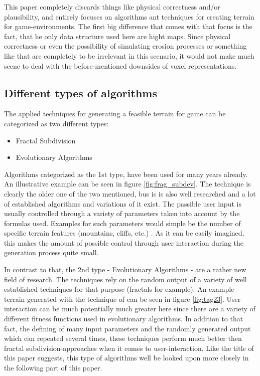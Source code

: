 This paper completely discards things like physical correctness and/or plausibility, and entirely focuses on algorithms ant techniques for creating terrain for game-environments. The first big difference that comes with that focus is the fact, that he only data structure used here are hight maps. Since physical correctness or even the possibility of simulating erosion processes or something like that are completely to be irrelevant in this scenario, it would not make much scene to deal with the before-mentioned downsides of voxel representations.

\subsection{Different types of algorithms}
The applied techniques for generating a feasible terrain for game can be categorized as two different types:
\begin{itemize}
	\item Fractal Subdivision 
	\item Evolutionary Algorithms
\end{itemize}

Algorithms categorized as the 1st type, have been used for many years already. An illustrative example can be seen in figure \ref{fig:frag_subdev}. The technique is clearly the older one of the two mentioned, bus is is also well researched and a lot of established algorithms and variations of it exist. The passible user input is usually controlled through a variety of parameters taken into account by the formulas used. Examples for such parameters would simple be the number of specific terrain features (mountains, cliffs, etc.) \cite{raffe2012survey}. As it can be easily imagined, this makes the amount of possible control through user interaction during the generation process quite small.

In contrast to that, the 2nd type - Evolutionary Algorithms - are a rather new field of research. The techniques rely on the random output of a variety of well established techniques for that purpose (fractals for example). An example terrain generated with the technique of \cite{togelius2010towards} can be seen in figure \ref{fig:tag23}. User interaction can be much potentially much greater here since there are a variety of different fitness functions used in evolutionary algorithms. In addition to that fact, the defining of many input parameters and the randomly generated output which can repeated several times, these techniques perform much better then fractal subdivision-approaches when it comes to user-interaction. Like the title of this paper suggests, this type of algorithms well be looked upon more closely in the following part of this paper.

